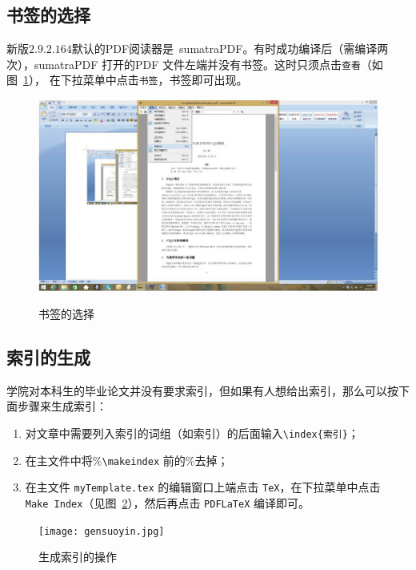 \subsection{书签的选择}
新版\CTeX$2.9.2.164$默认的{\rm PDF}阅读器是~{\rm sumatraPDF}。有时成功编译后（需编译两次），{\rm sumatraPDF} 打开的{\rm PDF} 文件左端并没有书签。这时只须点击{\tt 查看}（如图~\ref{fig:bookmarkselection}），
在下拉菜单中点击{\tt 书签}，书签即可出现。
\begin{figure}
	\centering
	\includegraphics[width=16cm]{codes/selectbookmarks.eps}\\
	\caption{书签的选择}\label{fig:bookmarkselection}
\end{figure}
\subsection{索引的生成}
学院对本科生的毕业论文并没有要求索引，但如果有人想给出索引，那么可以按下面步骤来生成索引：
\begin{enumerate}
	\item 对文章中需要列入索引的词组（如索引）的后面输入\verb=\index{索引}=；
	\item 在主文件中将\%\verb=\makeindex= 前的\%去掉；
	\item 在主文件{ \tt myTemplate.tex} 的编辑窗口上端点击{ \tt TeX}，在下拉菜单中点击{\tt Make~Index}（见图~\ref{fig:gensuoyin}），然后再点击{ \tt PDFLaTeX} 编译即可。
\end{enumerate}
\begin{figure}
	\centering
	\texttt{[image: gensuoyin.jpg]}\\
	\caption{生成索引的操作}\label{fig:gensuoyin}
\end{figure}

